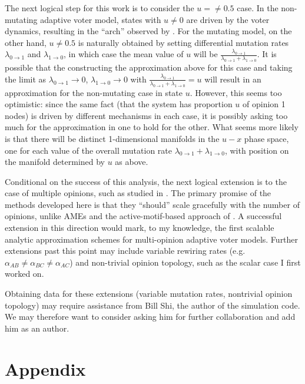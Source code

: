 \documentclass[english]{scrartcl}
\begin{document}
	The next logical step for this work is to consider the $u = \neq 0.5$ case. In the non-mutating adaptive voter model, states with $u \neq 0$ are driven by the voter dynamics, resulting in the ``arch'' observed by \cite{Durrett2012}. For the mutating model, on the other hand, $u \neq 0.5$ is naturally obtained by setting differential mutation rates $\lambda_{0\rightarrow 1}$ and $\lambda_{1\rightarrow 0}$, in which case the mean value of $u$ will be $\frac{\lambda_{0\rightarrow1}}{\lambda_{0\rightarrow 1} + \lambda_{1 \rightarrow 0}}$. It is possible that the constructing the approximation above for this case and taking the limit as $\lambda_{0\rightarrow 1} \rightarrow 0$, $\lambda_{1\rightarrow 0} \rightarrow 0$ with $\frac{\lambda_{0\rightarrow1}}{\lambda_{0\rightarrow 1} + \lambda_{1 \rightarrow 0}} = u$ will result in an approximation for the non-mutating case in state $u$. However, this seems too optimistic: since the same fact (that the system has proportion $u$ of opinion 1 nodes) is driven by different mechanisms in each case, it is possibly asking too much for the approximation in one to hold for the other. What seems more likely is that there will be distinct 1-dimensional manifolds in the $u-x$ phase space, one for each value of the overall mutation rate $\lambda_{0\rightarrow 1} + \lambda_{1\rightarrow 0}$, with position on the manifold determined by $u$ as above. 

	Conditional on the success of this analysis, the next logical extension is to the case of multiple opinions, such as studied in \cite{Shi2013}. The primary promise of the methods developed here is that they ``should'' scale gracefully with the number of opinions, unlike AMEs and the active-motif-based approach of \cite{Demirel2012}. A successful extension in this direction would mark, to my knowledge, the first scalable analytic approximation schemes for multi-opinion adaptive voter models. Further extensions past this point may include variable rewiring rates (e.g. $\alpha_{AB} \neq \alpha_{BC} \neq \alpha_{AC}$) and non-trivial opinion topology, such as the scalar case I first worked on.  

	Obtaining data for these extensions (variable mutation rates, nontrivial opinion topology) may require assistance from Bill Shi, the author of the simulation code. We may therefore want to consider asking him for further collaboration and add him as an author. 

\section{Appendix}
\end{document}
